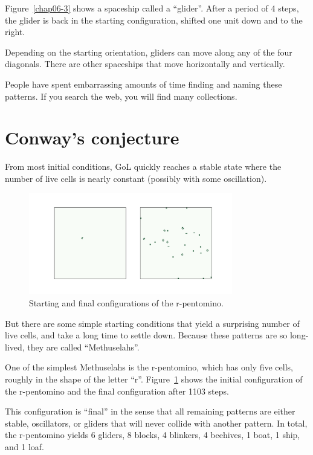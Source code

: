 \documentclass[12pt]{book}
\theoremstyle{exercise}
\begin{document}
Figure~\ref{chap06-3} shows a spaceship called a
``glider''.  After a period of 4 steps, the glider is back in the
starting configuration, shifted one unit down and to the right.


Depending on the starting orientation, gliders can move along any
of the four diagonals.  There are other spaceships that
move horizontally and vertically.

People have spent embarrassing
amounts of time finding and naming these patterns.  If you search
the web, you will find many collections.

\section{Conway's conjecture}

From most initial conditions, GoL quickly reaches a stable
state where the number of live cells is nearly constant
(possibly with some oscillation).

\begin{figure}
\centerline{\includegraphics[height=1.75in]{figs/chap06-4.pdf}}
\caption{Starting and final configurations of the r-pentomino.}
\label{chap06-4}
\end{figure}

But there are some simple starting conditions that 
yield a surprising number of live cells, and take a
long time to settle down.  Because these patterns are so long-lived, they
are called ``Methuselahs''.


One of the simplest Methuselahs is the
r-pentomino, which has only five cells, roughly in the shape of the
letter ``r''.  Figure~\ref{chap06-4} shows the initial configuration
of the r-pentomino and the final configuration after 1103 steps.

This configuration is ``final'' in the sense that all remaining
patterns are either stable, oscillators, or gliders that will never
collide with another pattern.  In total, the r-pentomino yields 6
gliders, 8 blocks, 4 blinkers, 4 beehives, 1 boat, 1 ship, and 1 loaf.
\end{document}
